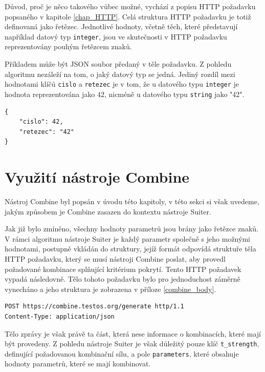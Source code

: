  Důvod, proč je něco takového vůbec možné, vychází z popisu HTTP požadavku popsaného v kapitole \ref{chap_HTTP}. Celá struktura HTTP požadavku je totiž definovaná jako řetězec. Jednotlivé hodnoty, včetně těch, které představují například datový typ \texttt{integer}, jsou ve skutečnosti v HTTP požadavku reprezentovány pouhým řetězcem znaků. 

 Příkladem může být JSON soubor předaný v těle požadavku. Z pohledu algoritmu nezáleží na tom, o jaký datový typ se jedná. Jediný rozdíl mezi hodnotami klíčů \texttt{cislo} a \texttt{retezec} je v tom, že u datového typu \texttt{integer} je hodnota reprezentována jako $42$, nicméně u datového typu \texttt{string} jako "42".
 \begin{lstlisting}[frame=single,language={json2}]
{
	"cislo": 42,
	"retezec": "42"
}
\end{lstlisting}


\section{Využití nástroje Combine}
\label{sec_combine}

Nástroj Combine byl popsán v úvodu této kapitoly, v této sekci si však uvedeme, jakým způsobem je Combine zasazen do kontextu nástroje Suiter.

Jak již bylo zmíněno, všechny hodnoty parametrů jsou brány jako řetězce znaků. V rámci algoritmu nástroje Suiter je každý parametr společně s jeho možnými hodnotami, postupně vkládán do struktury, jejíž formát odpovídá struktuře těla HTTP požadavku, který se musí nástroji Combine poslat, aby provedl požadované kombinace splňující kritérium pokrytí. Tento HTTP požadavek vypadá následovně. Tělo tohoto požadavku bylo pro jednoduchost záměrně vynecháno a jeho struktura je zobrazena v příloze \ref{combine_body}. 

\begin{lstlisting}[frame=single]
POST https://combine.testos.org/generate http/1.1
Content-Type: application/json
\end{lstlisting}

Tělo zprávy je však právě ta část, která nese informace o kombinacích, které mají být provedeny. Z pohledu nástroje Suiter je však důležitý pouze klíč \texttt{t\_strength}, definující požadovanou kombinační sílu, a pole \texttt{parameters}, které obsahuje hodnoty parametrů, které se mají kombinovat. 



